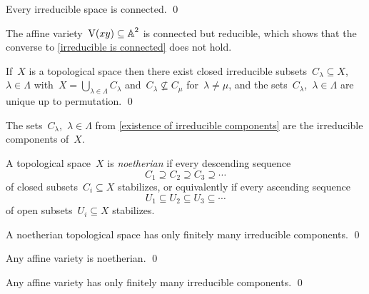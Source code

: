 \begin{lemma}
  \label{irreducible is connected}
  Every irreducible space is connected.
  \qed
\end{lemma}


\begin{example}
  The affine variety~$\operatorname{V}(xy) \subseteq \operatorname{\mathbb{A}}^2$ is connected but reducible, which shows that the converse to \cref{irreducible is connected} does not hold.
\end{example}


\begin{proposition}
  \label{existence of irreducible components}
  If~$X$ is a topological space then there exist closed irreducible subsets~$C_\lambda \subseteq X$,~$\lambda \in \Lambda$ with~$X = \bigcup_{\lambda \in \Lambda} C_\lambda$ and~$C_\lambda \nsubseteq C_\mu$ for~$\lambda \neq \mu$, and the sets~$C_\lambda$,~$\lambda \in \Lambda$ are unique up to permutation.
  \qed
\end{proposition}


\begin{definition}
  The sets~$C_\lambda$,~$\lambda \in \Lambda$ from \cref{existence of irreducible components} are the irreducible components of~$X$.
\end{definition}


\begin{definition}
  A topological space~$X$ is \emph{noetherian} if every descending sequence
  \[
              C_1
    \supseteq C_2
    \supseteq C_3
    \supseteq \dotsb
  \]
  of closed subsets~$C_i \subseteq X$ stabilizes, or equivalently if every ascending sequence
  \[
              U_1
    \subseteq U_2
    \subseteq U_3
    \subseteq \dotsb
  \]
  of open subsets~$U_i \subseteq X$ stabilizes.
\end{definition}


\begin{lemma}
  A noetherian topological space has only finitely many irreducible components.
  \qed
\end{lemma}


\begin{lemma}
  Any affine variety is noetherian.
  \qed
\end{lemma}


\begin{corollary}
  Any affine variety has only finitely many irreducible components.
  \qed
\end{corollary}


